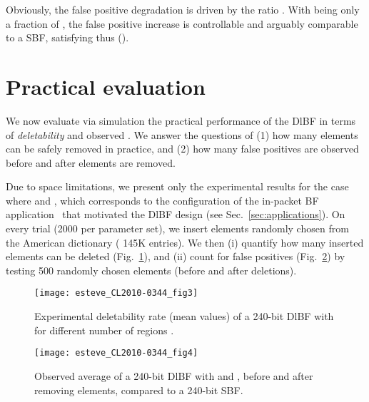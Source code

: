 \documentclass[conference]{IEEEtran}
\begin{document}
\begin{footnotesize}

\end{footnotesize}
Obviously, the false positive degradation is driven by the ratio .  
With   being only a fraction of , the false positive increase is controllable and arguably comparable to a SBF, satisfying thus  ().






\section{Practical evaluation}
\label{sec:evaluation}

We now evaluate via simulation the practical performance of the DlBF in terms of \textit{deletability} and observed . 
We answer the questions of (1) how many elements can be safely removed in practice, and (2) how many false positives are observed before and after elements are removed. 

Due to space limitations, we present only the experimental results for the case where  and , which corresponds to the configuration of the in-packet BF application~\cite{lipsin} that motivated the DlBF design (see Sec.~\ref{sec:applications}). On every trial (2000 per parameter set), we insert  elements randomly chosen from the American dictionary ( 145K entries). We then (i) quantify how many inserted elements can be deleted (Fig.~\ref{fig:bfd-exp}), and (ii) count for false positives (Fig.~\ref{fig:fpr-exp}) by testing 500 randomly chosen elements (before and after deletions).
\begin{figure}[t]
\centering
\texttt{[image: esteve\_CL2010-0344\_fig3]} 
\caption{Experimental deletability rate (mean values) of a 240-bit DlBF with  for different number of regions .}
\label{fig:bfd-exp}
\end{figure}
\begin{figure}[t]
\centering
\texttt{[image: esteve\_CL2010-0344\_fig4]} 
\caption{Observed average  of a 240-bit DlBF with  and , before and after removing elements, compared to a 240-bit SBF.}
\label{fig:fpr-exp}
\end{figure}
\end{document}
